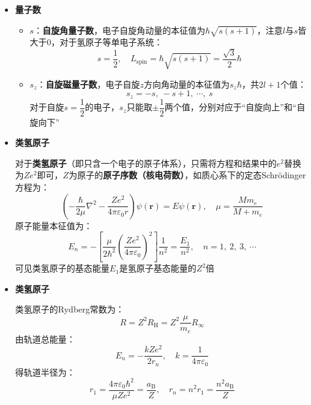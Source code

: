 \documentclass{beamer}
\renewcommand{\bm}{\symbf}
\renewcommand\epsilon{\varepsilon}
\newenvironment{slide}{
    \begin{frame}{\bfseries{\sectiontitle}}
}{
    \end{frame}
}
\begin{document}
\begin{slide}
    \begin{itemize}
        \item \textbf{量子数}
        \begin{itemize}
            \item $s$：\textbf{自旋角量子数}，电子自旋角动量的本征值为$\hbar\sqrt{s(s+1)}$，注意$l$与$s$皆大于$0$，对于氢原子等单电子系统：
            \[
                s=\dfrac{1}{2},\quad L_{\mathrm{spin}} = \hbar\sqrt{s(s+1)} = \frac{\sqrt{3}}{2}\hbar
            \]

            \item $s_z$：\textbf{自旋磁量子数}，电子自旋$z$方向角动量的本征值为$s_z\hbar$，共$2l+1$个值：
            \[
                s_z = -s,\ -s+1,\ \cdots,\ s
            \]
            对于自旋$s=\dfrac{1}{2}$的电子，$s_z$只能取$\pm\dfrac{1}{2}$两个值，分别对应于“自旋向上”和“自旋向下”
        \end{itemize}
    \end{itemize}
\end{slide}

\begin{slide}
    \begin{itemize}
        \item \textbf{类氢原子}

        对于\textbf{类氢原子}（即只含一个电子的原子体系），只需将方程和结果中的$e^2$替换为$Ze^2$即可，$Z$为原子的\textbf{原子序数（核电荷数）}，如质心系下的定态Schrödinger方程为：
        \[
            \left(-\frac{\hbar}{2\mu}\nabla^2-\frac{Ze^2}{4\pi\epsilon_0r}\right)\psi(\bm{r}) = E\psi(\bm{r}),\quad \mu = \frac{Mm_e}{M+m_e}
        \]
        原子能量本征值为：
        \[
            E_n = -\left[\frac{\mu}{2\hbar^2}\left(\frac{Ze^2}{4\pi\epsilon_0}\right)^{\!2}\right]\frac{1}{n^2} = \frac{E_1}{n^2},\quad n = 1,\ 2,\ 3,\ \cdots
        \]
        可见类氢原子的基态能量$E_1$是氢原子基态能量的$Z^2$倍
    \end{itemize}
\end{slide}

\begin{slide}
    \begin{itemize}
        \item \textbf{类氢原子}

        类氢原子的Rydberg常数为：
        \[
            R = Z^2 R_{\mathrm{H}} = Z^2\frac{\mu}{m_e}R_\infty
        \]
        由轨道总能量：
            \[
                E_n = -\frac{kZe^2}{2r_n},\quad k = \frac{1}{4\pi\epsilon_0}
            \]
        得轨道半径为：
        \[
            r_1 = \frac{4\pi\epsilon_0\hbar^2}{\mu Ze^2} = \frac{a_{\mathrm{B}}}{Z},\quad r_n = n^2r_1 = \frac{n^2 a_{\mathrm{B}}}{Z}
        \]

    \end{itemize}
\end{slide}
\end{document}
